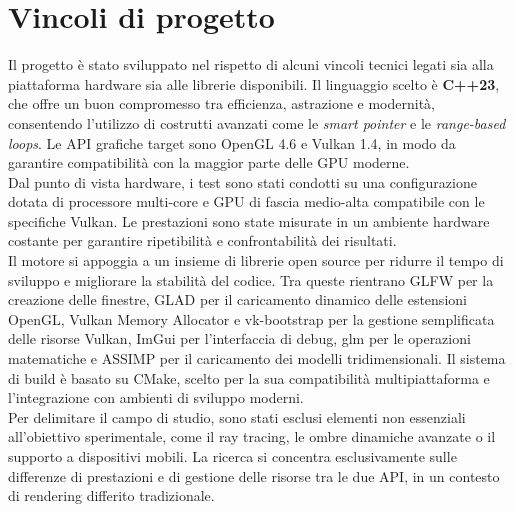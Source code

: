 \documentclass[12pt,a4paper,openright,twoside]{book}
\begin{document}
\section{Vincoli di progetto}
Il progetto è stato sviluppato nel rispetto di alcuni vincoli tecnici legati sia alla piattaforma hardware sia alle
librerie disponibili. Il linguaggio scelto è \textbf{C++23}, che offre un buon compromesso tra efficienza,
astrazione e modernità, consentendo l'utilizzo di costrutti avanzati come le \emph{smart pointer} e le
\emph{range-based loops}. Le API grafiche target sono OpenGL 4.6 e Vulkan 1.4, in modo da garantire compatibilità
con la maggior parte delle GPU moderne. \\
Dal punto di vista hardware, i test sono stati condotti su una configurazione dotata di processore multi-core e GPU
di fascia medio-alta compatibile con le specifiche Vulkan. Le prestazioni sono state misurate in un ambiente hardware
costante per garantire ripetibilità e confrontabilità dei risultati. \\
Il motore si appoggia a un insieme di librerie open source per ridurre il tempo di sviluppo e migliorare la stabilità
del codice. Tra queste rientrano GLFW per la creazione delle finestre, GLAD per il caricamento dinamico delle estensioni
OpenGL, Vulkan Memory Allocator e vk-bootstrap per la gestione semplificata delle risorse Vulkan, ImGui per
l'interfaccia di debug, glm per le operazioni matematiche e ASSIMP per il caricamento dei modelli tridimensionali.
Il sistema di build è basato su CMake, scelto per la sua compatibilità multipiattaforma e l'integrazione con ambienti
di sviluppo moderni. \\
Per delimitare il campo di studio, sono stati esclusi elementi non essenziali all'obiettivo sperimentale, come il
ray tracing, le ombre dinamiche avanzate o il supporto a dispositivi mobili. La ricerca si concentra esclusivamente
sulle differenze di prestazioni e di gestione delle risorse tra le due API, in un contesto di rendering differito
tradizionale.
\end{document}
